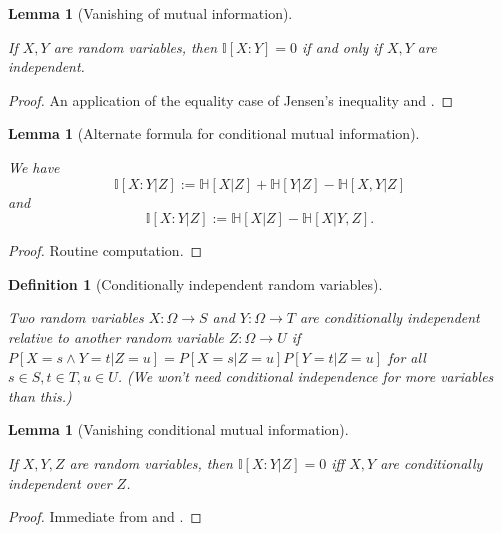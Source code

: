 \documentclass[10pt,a4paper]{article}
\newtheorem{lemma}[theorem]{Lemma}
\newtheorem{definition}[theorem]{Definition}
\newcommand{\lean}[1]{}
\newcommand{\uses}[1]{}
\newcommand{\leanok}{}
\newcommand{\bbH}{\mathbb{H}}
\newcommand{\bbI}{\mathbb{I}}
\begin{document}
\begin{lemma}[Vanishing of mutual information]
  \label{vanish-entropy}
  \uses{information-def, independent-def}
  \lean{ProbabilityTheory.mutualInfo_eq_zero}
  \leanok
  If $X,Y$ are random variables, then $\bbI[X:Y] = 0$ if and only if $X,Y$ are independent.
  \end{lemma}

  \begin{proof}
    \uses{concave}
    \leanok

    An application of the equality case of Jensen's inequality and .
  \end{proof}


\begin{lemma}[Alternate formula for conditional mutual information]
  \label{conditional-mutual-alt}
  \uses{conditional-mutual-def}
  \lean{ProbabilityTheory.condMutualInfo_eq, ProbabilityTheory.condMutualInfo_eq'}\leanok
We have
  $$ \bbI[X:Y|Z] := \bbH[X|Z] + \bbH[Y|Z] - \bbH[X,Y|Z]$$
and
  $$ \bbI[X:Y|Z] := \bbH[X|Z] - \bbH[X|Y,Z].$$
\end{lemma}

\begin{proof}\leanok Routine computation.
\end{proof}


\begin{definition}[Conditionally independent random variables]
\label{conditional-independent-def}
\lean{ProbabilityTheory.CondIndepFun}\leanok
  Two random variables $X: \Omega \to S$ and $Y: \Omega \to T$ are conditionally independent relative to another random variable $Z: \Omega \to U$ if $P[X = s \wedge Y = t| Z=u] = P[X=s|Z=u] P[Y=t|Z=u]$ for all $s \in S, t \in T, u \in U$.  (We won't need conditional independence for more variables than this.)
\end{definition}

\begin{lemma}[Vanishing conditional mutual information]\label{conditional-vanish}
  \lean{ProbabilityTheory.condMutualInfo_eq_zero}
  \leanok
  If $X,Y,Z$ are random variables, then $\bbI[X:Y|Z] = 0$ iff $X,Y$ are conditionally independent over $Z$.
\end{lemma}

\begin{proof} \uses{vanish-entropy, conditional-independent-def}\leanok Immediate from  and .
\end{proof}
\end{document}
